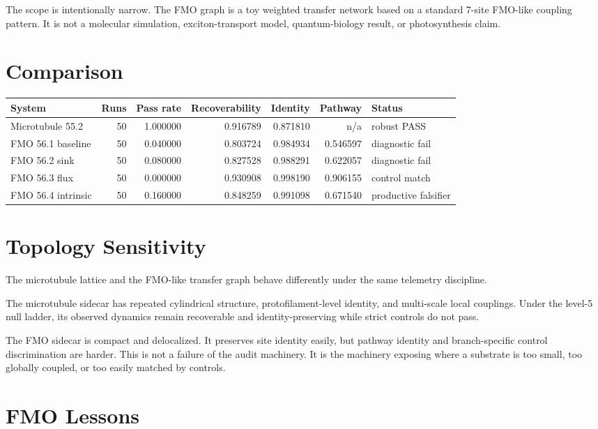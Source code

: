 \documentclass[11pt]{article}
\begin{document}
The scope is intentionally narrow. The FMO graph is a toy weighted transfer network based on a standard 7-site FMO-like coupling pattern. It is not a molecular simulation, exciton-transport model, quantum-biology result, or photosynthesis claim.

\section{Comparison}

\begin{center}
\begin{tabular}{lrrrrrl}
\toprule
System & Runs & Pass rate & Recoverability & Identity & Pathway & Status \\
\midrule
Microtubule 55.2 & 50 & 1.000000 & 0.916789 & 0.871810 & n/a & robust PASS \\
FMO 56.1 baseline & 50 & 0.040000 & 0.803724 & 0.984934 & 0.546597 & diagnostic fail \\
FMO 56.2 sink & 50 & 0.080000 & 0.827528 & 0.988291 & 0.622057 & diagnostic fail \\
FMO 56.3 flux & 50 & 0.000000 & 0.930908 & 0.998190 & 0.906155 & control match \\
FMO 56.4 intrinsic & 50 & 0.160000 & 0.848259 & 0.991098 & 0.671540 & productive falsifier \\
\bottomrule
\end{tabular}
\end{center}

\section{Topology Sensitivity}

The microtubule lattice and the FMO-like transfer graph behave differently under the same telemetry discipline.

The microtubule sidecar has repeated cylindrical structure, protofilament-level identity, and multi-scale local couplings. Under the level-5 null ladder, its observed dynamics remain recoverable and identity-preserving while strict controls do not pass.

The FMO sidecar is compact and delocalized. It preserves site identity easily, but pathway identity and branch-specific control discrimination are harder. This is not a failure of the audit machinery. It is the machinery exposing where a substrate is too small, too globally coupled, or too easily matched by controls.

\section{FMO Lessons}
\end{document}
